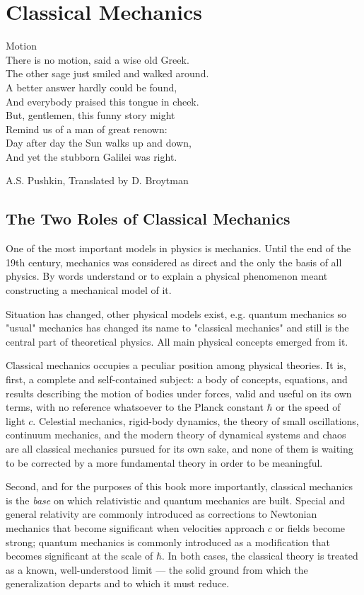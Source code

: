 \chapter{Classical Mechanics}
\label{cm}

{
\setlength{}
\epigraph {
    Motion\\
There is no motion, said a wise old Greek.\\
The other sage just smiled and walked around.\\
A better answer hardly could be found,\\
And everybody praised this tongue in cheek.\\
But, gentlemen, this funny story might\\
Remind us of a man of great renown:\\
Day after day the Sun walks up and down,\\
And yet the stubborn Galilei was right.
} {A.S. Pushkin, Translated by D. Broytman }
}

\section{The Two Roles of Classical Mechanics}
\label{cm:tr}

One of the most important models in physics is mechanics.
Until the end of the 19th century, mechanics was considered as direct and the only
the basis of all physics. By words understand or
to explain a physical phenomenon meant constructing a mechanical model of it.

Situation has changed,  other physical models exist, e.g. quantum mechanics so 
"usual" mechanics has changed its name to "classical mechanics" and still is
the central part of theoretical physics. All main physical concepts emerged from
it.

Classical mechanics occupies a peculiar position among physical theories. It is,
first, a complete and self-contained subject: a body of concepts, equations, and
results describing the motion of bodies under forces, valid and useful on its own
terms, with no reference whatsoever to the Planck constant $\hbar$ or the speed of
light $c$. Celestial mechanics, rigid-body dynamics, the theory of small
oscillations, continuum mechanics, and the modern theory of dynamical systems and
chaos are all classical mechanics pursued for its own sake, and none of them is
waiting to be corrected by a more fundamental theory in order to be meaningful.

Second, and for the purposes of this book more importantly, classical mechanics is
the \emph{base} on which relativistic and quantum mechanics are built. Special and
general relativity are commonly introduced as corrections to Newtonian mechanics
that become significant when velocities approach $c$ or fields become strong;
quantum mechanics is commonly introduced as a modification that becomes significant
at the scale of $\hbar$. In both cases, the classical theory is treated as a known,
well-understood limit --- the solid ground from which the generalization departs
and to which it must reduce.

